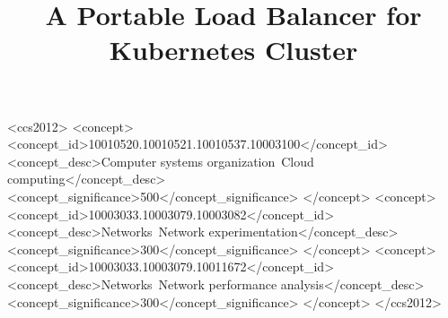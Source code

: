 \documentclass[sigconf]{acmart}
\begin{document}
\title{A Portable Load Balancer for Kubernetes Cluster}





%
%

\begin{CCSXML}
<ccs2012>
<concept>
<concept_id>10010520.10010521.10010537.10003100</concept_id>
<concept_desc>Computer systems organization~Cloud computing</concept_desc>
<concept_significance>500</concept_significance>
</concept>
<concept>
<concept_id>10003033.10003079.10003082</concept_id>
<concept_desc>Networks~Network experimentation</concept_desc>
<concept_significance>300</concept_significance>
</concept>
<concept>
<concept_id>10003033.10003079.10011672</concept_id>
<concept_desc>Networks~Network performance analysis</concept_desc>
<concept_significance>300</concept_significance>
</concept>
</ccs2012>
\end{CCSXML}





\maketitle




 
\end{document}
